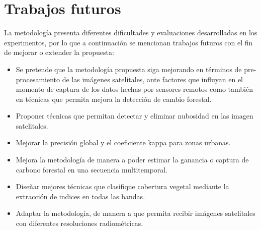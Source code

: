 \section{Trabajos futuros}
La metodolog\'ia presenta diferentes dificultades y evaluaciones desarrolladas en los experimentos, por lo que a continuaci\'on se mencionan trabajos futuros con el fin de mejorar o extender la propuesta:
\begin{itemize}
\item Se pretende que la metodolog\'ia propuesta siga mejorando en t\'erminos de pre-procesamiento de las im\'agenes satelitales, ante factores que influyan en el momento de captura de los datos hechas por sensores remotos como tambi\'en en t\'ecnicas que permita mejora la detecci\'on de cambio forestal.
\item Proponer t\'ecnicas que permitan detectar y eliminar nubosidad en las imagen satelitales.
\item Mejorar la precisi\'on global y el coeficiente kappa para zonas urbanas.
\item Mejora la metodolog\'ia de manera a poder estimar la ganancia o captura de carbono forestal en una secuencia multitemporal.
\item Dise\~{n}ar mejores t\'ecnicas que clasifique cobertura vegetal mediante la extracci\'on de indices en todas las bandas.
\item Adaptar la metodolog\'ia, de manera a que permita recibir im\'agenes satelitales con diferentes resoluciones radiom\'etricas.


\end{itemize}

